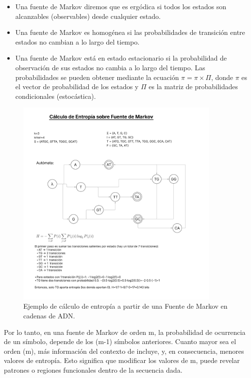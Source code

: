 \documentclass[11pt,spanish,listoffigures,listoftables]{tfgetsinf}
\begin{document}
\begin{itemize}
   \item Una fuente de Markov diremos que es ergódica si todos los estados son alcanzables (observables) desde cualquier estado.
   \item Una fuente de Markov es homogénea si las probabilidades de transición entre estados no cambian a lo largo del tiempo.
   \item Una fuente de Markov está en estado estacionario si la probabilidad de observación de sus estados no cambia a lo largo del tiempo. Las probabilidades se pueden obtener mediante la ecuación $\pi = \pi \times \Pi$, donde $\pi$ es el vector de probabilidad de los estados y $\Pi$ es la matriz de probabilidades condicionales (estocástica).
\end{itemize}

\begin{figure}[H]
   \centering
   \includegraphics[width=0.9\textwidth]{entropia_markov_ADN.png}
   \caption{Ejemplo de cálculo de entropía a partir de una Fuente de Markov en cadenas de ADN.}
   \label{fig:etiqueta_opcional4}
\end{figure}

Por lo tanto, en una fuente de Markov de orden m, la probabilidad de ocurrencia de un símbolo, depende de los (m-1) símbolos anteriores. Cuanto mayor sea el orden (m), más información del contexto de incluye, y, en consecuencia, menores valores de entropía. Esto significa que modificar los valores de m, puede revelar patrones o regiones funcionales dentro de la secuencia dada. 
\end{document}
